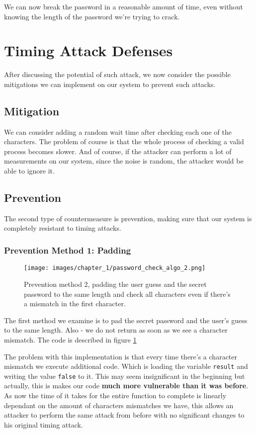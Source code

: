 We can now break the password in a reasonable amount of time, even without
knowing the length of the password we're trying to crack.

\section{Timing Attack Defenses}
After discussing the potential of such attack, we now consider the possible
mitigations we can implement on our system to prevent such attacks.

\subsection{Mitigation}
We can consider adding a random wait time after checking each one of the
characters. The problem of course is that the whole process of checking a valid
process becomes slower. And of course, if the attacker can perform a lot of
measurements on our system, since the noise is random, the attacker would be
able to ignore it.


\subsection{Prevention}
The second type of countermeasure is prevention, making sure that our system is
completely resistant to timing attacks.

\subsubsection{Prevention Method 1: Padding}
\begin{figure}[H]
    \centering
    \texttt{[image: images/chapter\_1/password\_check\_algo\_2.png]}
    \caption
    {Prevention method 2, padding the user guess and the secret password to the
    same length and check all characters even if there's a mismatch in the first
    character.}
    \label{c1_fig_pass_check_2}
\end{figure}

The first method we examine is to pad the secret password and the user's guess
to the same length. Also - we do not return as soon as we see a character
mismatch. The code is described in figure 
 \ref{c1_fig_pass_check_2}

The problem with this implementation is that every time there's a character
mismatch we execute additional code. Which is loading the variable
\lstinline{result} and writing the value \lstinline{false} to it. This may seem
insignificant in the beginning but actually, this is makes our code \textbf{much
more vulnerable than it was before}. As now the time of it takes for the entire
function to complete is linearly dependant on the amount of characters
mismatches we have, this allows an attacker to perform the same attack from
before with no significant changes to his original timing attack.

